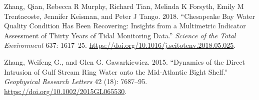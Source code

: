 \documentclass[
]{book}
\newlength{\cslhangindent}
\newenvironment{cslreferences}%
  {\setlength{\parindent}{0pt}%
  \everypar{\setlength{\hangindent}{\cslhangindent}}\ignorespaces}%
  {\par}
\begin{document}
\begin{cslreferences}
\leavevmode\hypertarget{ref-zhang2018}{}%
Zhang, Qian, Rebecca R Murphy, Richard Tian, Melinda K Forsyth, Emily M Trentacoste, Jennifer Keisman, and Peter J Tango. 2018. ``Chesapeake Bay Water Quality Condition Has Been Recovering: Insights from a Multimetric Indicator Assessment of Thirty Years of Tidal Monitoring Data.'' \emph{Science of the Total Environment} 637: 1617--25. \url{https://doi.org/10.1016/j.scitotenv.2018.05.025}.

\leavevmode\hypertarget{ref-zhang_dynamics_2015}{}%
Zhang, Weifeng G., and Glen G. Gawarkiewicz. 2015. ``Dynamics of the Direct Intrusion of Gulf Stream Ring Water onto the Mid-Atlantic Bight Shelf.'' \emph{Geophysical Research Letters} 42 (18): 7687--95. \url{https://doi.org/10.1002/2015GL065530}.
\end{cslreferences}
\end{document}
